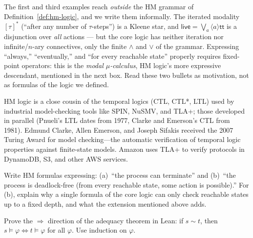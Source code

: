 \documentclass[11pt, a4paper, oneside]{book}
\newcommand{\bisim}{\sim}
\newcounter{exercise}[chapter]
\begin{document}
\begin{warning}[title={Beyond the core logic}]
The first and third examples reach \emph{outside} the HM grammar of
Definition~\ref{def:hm-logic}, and we write them informally. The iterated
modality $[\tau]^*$ (``after any number of $\tau$-steps'') is a Kleene star,
and $\mathsf{live} = \bigvee_a \langle a \rangle\mathsf{tt}$ is a disjunction
over \emph{all} actions --- but the core logic has neither iteration nor
infinite/$n$-ary connectives, only the finite $\wedge$ and $\vee$ of the
grammar. Expressing ``always,'' ``eventually,'' and ``for every reachable
state'' properly requires fixed-point operators: this is the
\emph{modal $\mu$-calculus}, HM logic's more expressive descendant, mentioned
in the next box. Read these two bullets as motivation, not as formulas of the
logic we defined.
\end{warning}

\begin{historical}[title={From HM Logic to Model Checking}]
HM logic is a close cousin of the temporal logics (CTL, CTL*, LTL) used by
industrial model-checking tools like SPIN, NuSMV, and TLA+; those developed in
parallel (Pnueli's LTL dates from 1977, Clarke and Emerson's CTL from 1981). Edmund Clarke,
Allen Emerson, and Joseph Sifakis received the 2007 Turing Award for
model checking---the automatic verification of temporal logic properties
against finite-state models. Amazon uses TLA+ to verify protocols in DynamoDB,
S3, and other AWS services.
\end{historical}

\begin{exercisebox}[title={Exercise 8.1}]
Write HM formulas expressing: (a)~``the process can terminate'' and (b)~``the
process is deadlock-free (from every reachable state, some action is
possible).'' For (b), explain why a single formula of the core logic can only
check reachable states up to a fixed depth, and what the extension mentioned
above adds.
\end{exercisebox}

\begin{exercisebox}[title={Exercise 8.2}]
Prove the $\Rightarrow$ direction of the adequacy theorem in Lean: if
$s \bisim t$, then $s \models \varphi \iff t \models \varphi$ for all $\varphi$.
Use induction on $\varphi$.
\end{exercisebox}

\end{document}
